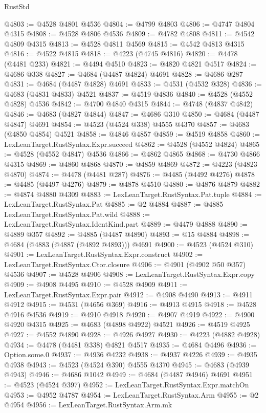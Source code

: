 \begin{lexlean}{RustStd}
\begin{coremodule}
@4803 := @4528 @4801 @4536
@4804 := @4799 @4803
@4806 := @4747 @4804 @4315
@4808 := @4528 @4806 @4536
@4809 := @4782 @4808
@4811 := @4542 @4809 @4315
@4813 := @4528 @4811 @4569
@4815 := @4542 @4813 @4315
@4816 := @4522 @4815
@4818 := @4223 (@4745 @4816)
@4820 := @4478 (@4481 @233)
@4821 := @4494 @4510
@4823 := @4820 @4821 @4517
@4824 := @4686 @338
@4827 := @4684 (@4487 @4824) @4691
@4828 := @4686 @287
@4831 := @4684 (@4487 @4828) @4691
@4833 := @4531 (@4532 @328)
@4836 := @4683 (@4831 @4833) @4521
@4837 := @4519 @4836
@4840 := @4528 (@4552 @4828) @4536
@4842 := @4700 @4840 @4315
@4844 := @4748 (@4837 @4842)
@4846 := @4683 (@4827 @4844)
@4847 := @4686 @310
@4850 := @4684 (@4487 @4847) @4691
@4854 := @4523 (@4524 @338) @4555 @4370
@4857 := @4683 (@4850 @4854) @4521
@4858 := @4846 @4857
@4859 := @4519 @4858
@4860 := LexLeanTarget.RustSyntax.Expr.succeed
@4862 := @4528 (@4552 @4824)
@4865 := @4528 (@4552 @4847) @4536
@4866 := @4862 @4865
@4868 := @4730 @4866 @4315
@4869 := @4860 @4868
@4870 := @4859 @4869
@4872 := @4223 (@4823 @4870)
@4874 := @4478 (@4481 @287)
@4876 := @4485 (@4492 @4276)
@4878 := @4485 (@4497 @4276)
@4879 := @4878 @4510
@4880 := @4876 @4879
@4882 := @4874 @4880 @4309
@4883 := LexLeanTarget.RustSyntax.Pat.tuple
@4884 := LexLeanTarget.RustSyntax.Pat
@4885 := @2 @4884
@4887 := @4885 LexLeanTarget.RustSyntax.Pat.wild
@4888 := LexLeanTarget.RustSyntax.IdentKind.part
@4889 := @4479 @4888
@4890 := @4889 @357
@4892 := @4885 (@4487 @4890)
@4893 := @15 @4884
@4898 := @4684 (@4883 (@4887 (@4892 @4893))) @4691
@4900 := @4523 (@4524 @310)
@4901 := LexLeanTarget.RustSyntax.Expr.construct
@4902 := LexLeanTarget.RustSyntax.Ctor.closure
@4906 := @4901 (@4902 @50 @357) @4536
@4907 := @4528 @4906
@4908 := LexLeanTarget.RustSyntax.Expr.copy
@4909 := @4908 @4495
@4910 := @4528 @4909
@4911 := LexLeanTarget.RustSyntax.Expr.pair
@4912 := @4908 @4490
@4913 := @4911 @4912
@4915 := @4531 (@4656 @369)
@4916 := @4913 @4915
@4918 := @4528 @4916 @4536
@4919 := @4910 @4918
@4920 := @4907 @4919
@4922 := @4900 @4920 @4315
@4925 := @4683 (@4898 @4922) @4521
@4926 := @4519 @4925
@4927 := @4552 @4890
@4928 := @4926 @4927
@4930 := @4223 (@4882 @4928)
@4934 := @4478 (@4481 @338) @4821 @4517
@4935 := @4684 @4496
@4936 := Option.some.{0}
@4937 := @4936 @4232
@4938 := @4937 @4226
@4939 := @4935 @4938
@4943 := @4523 (@4524 @390) @4555 @4370
@4945 := @4683 (@4939 @4943)
@4946 := @4686 @1042
@4949 := @4684 (@4487 @4946) @4691
@4951 := @4523 (@4524 @397)
@4952 := LexLeanTarget.RustSyntax.Expr.matchOn
@4953 := @4952 @4787
@4954 := LexLeanTarget.RustSyntax.Arm
@4955 := @2 @4954
@4956 := LexLeanTarget.RustSyntax.Arm.mk

\end{coremodule}
\end{lexlean}
